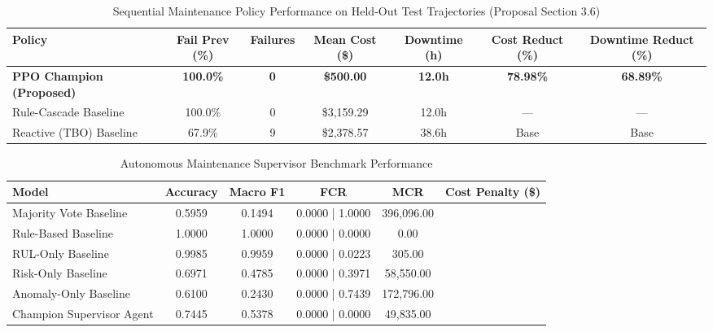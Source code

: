 \begin{table}[h]
\centering
\caption{Sequential Maintenance Policy Performance on Held-Out Test Trajectories (Proposal Section 3.6)}
\begin{tabular}{lcccccc}
\hline
Policy & Fail Prev (\%) & Failures & Mean Cost (\$) & Downtime (h) & Cost Reduct (\%) & Downtime Reduct (\%) \\
\hline
\textbf{PPO Champion (Proposed)} & \textbf{100.0\%} & \textbf{0} & \textbf{\$500.00} & \textbf{12.0h} & \textbf{78.98\%} & \textbf{68.89\%} \\
Rule-Cascade Baseline & 100.0\% & 0 & \$3,159.29 & 12.0h & — & — \\
Reactive (TBO) Baseline & 67.9\% & 9 & \$2,378.57 & 38.6h & Base & Base \\
\hline
\end{tabular}
\end{table}

\begin{table}[h]
\centering
\caption{Autonomous Maintenance Supervisor Benchmark Performance}
\begin{tabular}{lccccc}
\hline
Model & Accuracy & Macro F1 & FCR & MCR & Cost Penalty (\$) \\
\hline
Majority Vote Baseline & 0.5959 & 0.1494 & 0.0000 | 1.0000 & 396,096.00 \\
Rule-Based Baseline & 1.0000 & 1.0000 & 0.0000 | 0.0000 & 0.00 \\
RUL-Only Baseline & 0.9985 & 0.9959 & 0.0000 | 0.0223 & 305.00 \\
Risk-Only Baseline & 0.6971 & 0.4785 & 0.0000 | 0.3971 & 58,550.00 \\
Anomaly-Only Baseline & 0.6100 & 0.2430 & 0.0000 | 0.7439 & 172,796.00 \\
Champion Supervisor Agent & 0.7445 & 0.5378 & 0.0000 | 0.0000 & 49,835.00 \\
\hline
\end{tabular}
\end{table}
